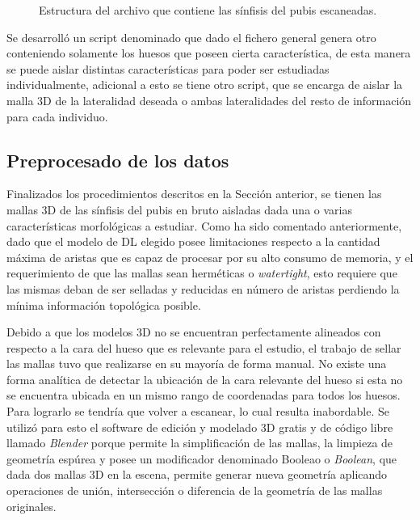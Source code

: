 \begin{figure}[h]
    \centering
    \begin{minipage}{4cm}
    \end{minipage}
    \caption[Estructura del archivo de datos]{Estructura del archivo que contiene las sínfisis del pubis escaneadas.}
    \label{fig:rawBoneFile}
\end{figure}

Se desarrolló un script denominado  que dado el fichero  general genera otro  conteniendo solamente los huesos que poseen cierta característica, de esta manera se puede aislar distintas características para poder ser estudiadas individualmente, adicional a esto se tiene otro script,  que se encarga de aislar la malla 3D de la lateralidad deseada o ambas lateralidades del resto de información para cada individuo.

\subsection{Preprocesado de los datos}
\label{section:dataPreprocess}
Finalizados los procedimientos descritos en la Sección anterior, se tienen las mallas 3D de las sínfisis del pubis en bruto aisladas dada una o varias características morfológicas a estudiar. Como ha sido comentado anteriormente, dado que el modelo de DL elegido posee limitaciones respecto a la cantidad máxima de aristas que es capaz de procesar por su alto consumo de memoria, y el requerimiento de que las mallas sean herméticas o \textit{watertight}, esto requiere que las mismas deban de ser selladas y reducidas en número de aristas perdiendo la mínima información topológica posible.

Debido a que los modelos 3D no se encuentran perfectamente alineados con respecto a la cara del hueso que es relevante para el estudio, el trabajo de sellar las mallas tuvo que realizarse en su mayoría de forma manual. No existe una forma analítica de detectar la ubicación de la cara relevante del hueso si esta no se encuentra ubicada en un mismo rango de coordenadas para todos los huesos. Para lograrlo se tendría que volver a escanear, lo cual resulta inabordable. Se utilizó para esto el software de edición y modelado 3D gratis y de código libre llamado \textit{Blender} \cite{blender} porque permite la simplificación de las mallas, la limpieza de geometría espúrea y posee un modificador denominado Booleao o \textit{Boolean}, que dada dos mallas 3D en la escena, permite generar nueva geometría aplicando operaciones de unión, intersección o diferencia de la geometría de las mallas originales.

